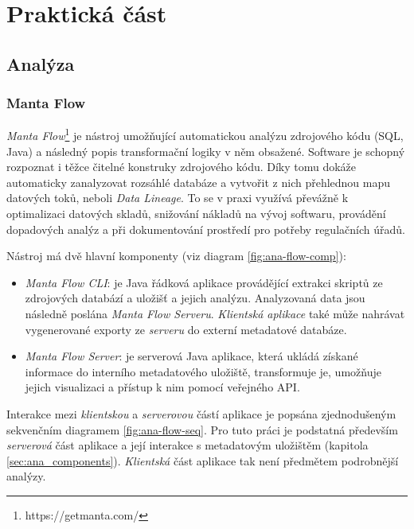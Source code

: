 \chapter{Praktická část}

\section{Analýza}


\subsection{Manta Flow}
\textit{Manta Flow}\footnote{https://getmanta.com/} je nástroj umožňující automatickou analýzu zdrojového kódu (SQL, Java) a následný popis transformační logiky v něm obsažené. Software je schopný rozpoznat i těžce čitelné konstruky zdrojového kódu. Díky tomu dokáže automaticky zanalyzovat rozsáhlé databáze a vytvořit z nich přehlednou mapu datových toků, neboli \textit{Data Lineage}. To se v praxi využívá převážně k optimalizaci datových skladů, snižování nákladů na vývoj softwaru, provádění dopadových analýz a při dokumentování prostředí pro potřeby regulačních úřadů.

Nástroj má dvě hlavní komponenty (viz diagram \ref{fig:ana-flow-comp}): 
\begin{itemize}
	\item{\textit{Manta Flow CLI}}: je Java řádková aplikace provádějící extrakci skriptů ze zdrojových databází a uložišť a jejich analýzu. Analyzovaná data jsou následně poslána \textit{Manta Flow Serveru}. \textit{Klientská aplikace} také může nahrávat vygenerované exporty ze \textit{serveru} do externí metadatové databáze. 
	\item{\textit{Manta Flow Server}}: je serverová Java aplikace, která ukládá získané informace do interního metadatového uložiště, transformuje je, umožňuje jejich visualizaci a přístup k nim pomocí veřejného API. 
\end{itemize}

Interakce mezi \textit{klientskou} a \textit{serverovou} částí aplikace je popsána zjednodušeným sekvenčním diagramem \ref{fig:ana-flow-seq}. Pro tuto práci je podstatná především \textit{serverová} část aplikace a její interakce s metadatovým uložištěm (kapitola \ref{sec:ana_components}). \textit{Klientská} část aplikace tak není předmětem podrobnější analýzy.

